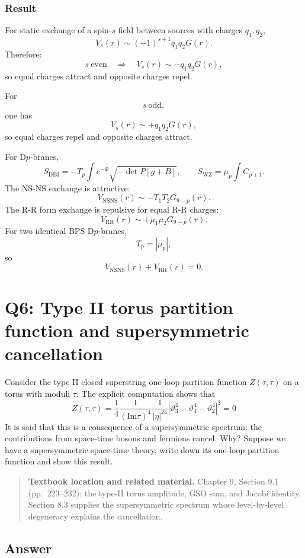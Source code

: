 \documentclass[
  10pt,
  a4paper,
  openany]{book}
\begin{document}
\subsubsection{Result}\label{result-8}

For static exchange of a spin-\(s\) field between sources with charges
\(q_1,q_2\), \[
V_s(r)\sim (-1)^{s+1}q_1q_2G(r).
\] Therefore: \[
s\ \text{even}
\quad\Longrightarrow\quad
V_s(r)\sim -q_1q_2G(r),
\] so equal charges attract and opposite charges repel.

For \[
s\ \text{odd},
\] one has \[
V_s(r)\sim +q_1q_2G(r),
\] so equal charges repel and opposite charges attract.

For D\(p\)-branes, \[
S_{\mathrm{DBI}}
=
-T_p\int e^{-\Phi}\sqrt{-\det P[g+B]},
\qquad
S_{\mathrm{WZ}}
=
\mu_p\int C_{p+1}.
\] The NS-NS exchange is attractive: \[
V_{\mathrm{NSNS}}(r)\sim -T_1T_2G_{9-p}(r).
\] The R-R form exchange is repulsive for equal R-R charges: \[
V_{\mathrm{RR}}(r)\sim +\mu_1\mu_2G_{9-p}(r).
\] For two identical BPS D\(p\)-branes, \[
T_p=|\mu_p|,
\] so \[
\boxed{
V_{\mathrm{NSNS}}(r)+V_{\mathrm{RR}}(r)=0.
}
\]

\section{Q6: Type II torus partition function and supersymmetric
cancellation}\label{q6-type-ii-torus-partition-function-and-supersymmetric-cancellation}

Consider the type II closed superstring one-loop partition function
\(Z(\tau,\bar{\tau})\) on a torus with moduli \(\tau\). The explicit
computation shows that \[
Z(\tau,\bar{\tau})=\frac{1}{4} \frac{1}{(\mathrm{Im}\tau)^4} \frac{1}{|\eta|^{24}}|\vartheta_{3}^4-\vartheta_{4}^4-\vartheta_{2}^4|^2=0
\] It is said that this is a consequence of a supersymmetric spectrum:
the contributions from space-time bosons and fermions cancel. Why?
Suppose we have a supersymmetric space-time theory, write down its
one-loop partition function and show this result.

\begin{quote}
\textbf{Textbook location and related material.} Chapter 9, Section 9.1
(pp.~223--232): the type-II torus amplitude, GSO sum, and Jacobi
identity. Section 8.3 supplies the supersymmetric spectrum whose
level-by-level degeneracy explains the cancellation.
\end{quote}

\subsection{Answer}\label{answer-9}
\end{document}
